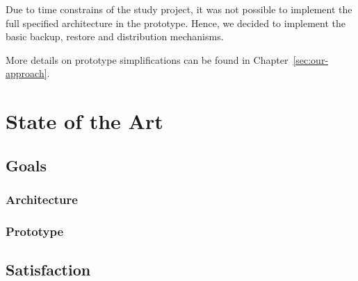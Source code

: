 Due to time constrains of the study project, it was not possible to implement the full specified architecture in the prototype. Hence, we decided to implement the basic backup, restore and distribution mechanisms.

More details on prototype simplifications can be found in Chapter~\ref{sec:our-approach}.

\section{State of the Art}

\subsection{Goals}

\subsubsection{Architecture}

\subsubsection{Prototype}



\subsection{Satisfaction}

